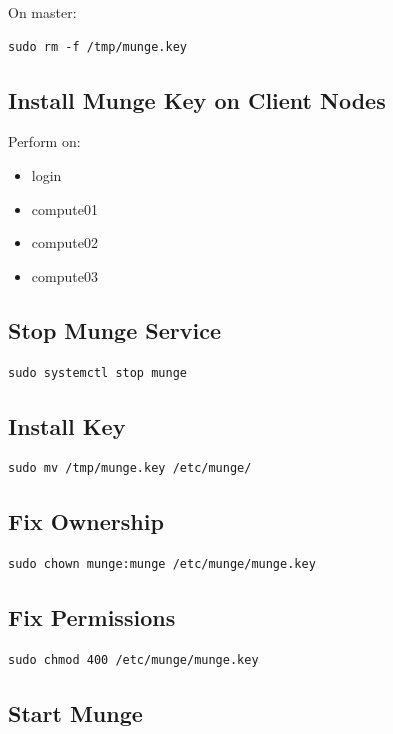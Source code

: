 \documentclass[11pt]{article}
\begin{document}
On master:

\begin{verbatim}
sudo rm -f /tmp/munge.key
\end{verbatim}
\subsection{Install Munge Key on Client Nodes}
\label{sec:orgb17f823}

Perform on:

\begin{itemize}
\item login
\item compute01
\item compute02
\item compute03
\end{itemize}
\subsection{Stop Munge Service}
\label{sec:org900caa0}

\begin{verbatim}
sudo systemctl stop munge
\end{verbatim}
\subsection{Install Key}
\label{sec:org8da6a6a}

\begin{verbatim}
sudo mv /tmp/munge.key /etc/munge/
\end{verbatim}
\subsection{Fix Ownership}
\label{sec:orge0dde17}

\begin{verbatim}
sudo chown munge:munge /etc/munge/munge.key
\end{verbatim}
\subsection{Fix Permissions}
\label{sec:org37527aa}

\begin{verbatim}
sudo chmod 400 /etc/munge/munge.key
\end{verbatim}
\subsection{Start Munge}
\label{sec:org6034b26}
\end{document}
